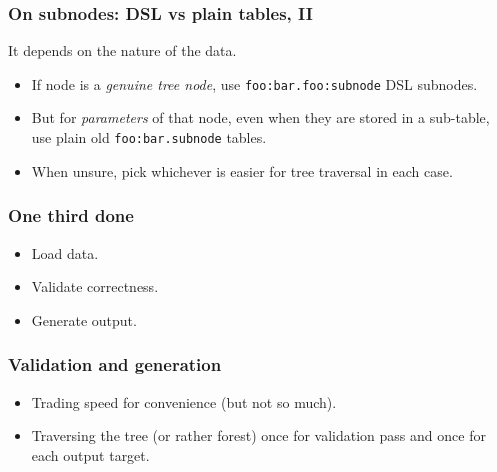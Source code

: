 \documentclass[handout]{beamer}
\begin{document}
\begin{frame}[fragile]

\frametitle{On subnodes: DSL vs plain tables, II}

It depends on the nature of the data.
\pause

\begin{itemize}
\item If node is a \emph{genuine tree node},
      use \verb|foo:bar.foo:subnode| DSL subnodes.
\pause
\item But for \emph{parameters} of that node,
      even when they are stored in a sub-table,
      use plain old \verb|foo:bar.subnode| tables.
\pause
\item When unsure, pick whichever is easier for tree traversal
      in each case.
\end{itemize}

\end{frame}


\begin{frame}

\frametitle{One third done}

\begin{itemize}
\item[\checkmark] Load data.
\item Validate correctness.
\item Generate output.
\end{itemize}

\end{frame}


\begin{frame}

\frametitle{Validation and generation}

\begin{itemize}
\item Trading speed for convenience (but not so much).
\item Traversing the tree (or rather forest) once for validation pass
      and once for each output target.
\end{itemize}

\end{frame}

\end{document}
